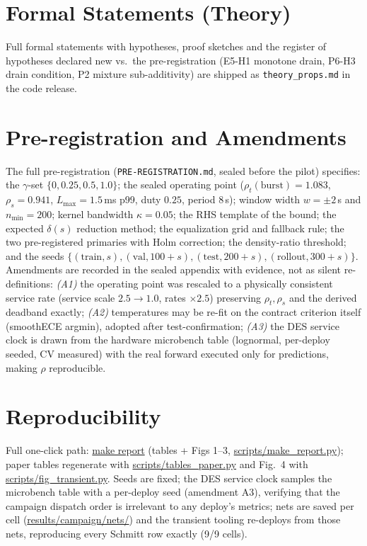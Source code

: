 \documentclass[sigconf,nonacm]{acmart}
\newcommand{\code}[1]{{\footnotesize\url{#1}}}
\newcommand{\delt}{\delta}
\begin{document}



\appendix
\section{Formal Statements (Theory)}
\label{app:theory}
Full formal statements with hypotheses, proof sketches and the register of
hypotheses declared new vs.\ the pre-registration (E5-H1 monotone drain,
P6-H3 drain condition, P2 mixture sub-additivity) are shipped as
\texttt{theory\_props.md} in the code release.
\section{Pre-registration and Amendments}
\label{app:prereg}
The full pre-registration (\texttt{PRE-REGISTRATION.md}, sealed before
the pilot) specifies: the $\gamma$-set $\{0,0.25,0.5,1.0\}$; the sealed
operating point ($\rho_t(\mathrm{burst})=1.083$, $\rho_s=0.941$,
$L_{\max}=1.5$\,ms p99, duty $0.25$, period 8\,s); window width
$w{=}\pm2$\,s and $n_{\min}{=}200$; kernel bandwidth
$\kappa{=}0.05$; the RHS template of the bound; the expected
$\delt(s)$ reduction method; the equalization grid and fallback rule;
the two pre-registered primaries with Holm correction; the
density-ratio threshold; and the seeds
$\{(\mathrm{train},s),(\mathrm{val},100{+}s),(\mathrm{test},200{+}s),(\mathrm{rollout},300{+}s)\}$.
Amendments are recorded in the sealed appendix with evidence, not as
silent re-definitions: \emph{(A1)} the operating point was rescaled to a
physically consistent service rate (service scale $2.5\to1.0$, rates
$\times 2.5$) preserving $\rho_t,\rho_s$ and the derived deadband
exactly; \emph{(A2)} temperatures may be re-fit on the contract criterion
itself (smoothECE argmin), adopted after test-confirmation; \emph{(A3)}
the DES service clock is drawn from the hardware microbench table
(lognormal, per-deploy seeded, CV measured) with the real forward
executed only for predictions, making $\rho$ reproducible.
\section{Reproducibility}
Full one-click path: \code{make report} (tables + Figs 1--3,
\code{scripts/make_report.py});
paper tables regenerate with \code{scripts/tables_paper.py} and
Fig.~4 with \code{scripts/fig_transient.py}.
Seeds are fixed; the DES service clock samples the microbench table
with a per-deploy seed (amendment A3), verifying that the campaign
dispatch order is irrelevant to any deploy's metrics;
nets are saved per cell (\code{results/campaign/nets/}) and the
transient tooling re-deploys from those nets, reproducing every
Schmitt row exactly (9/9 cells).
\end{document}
